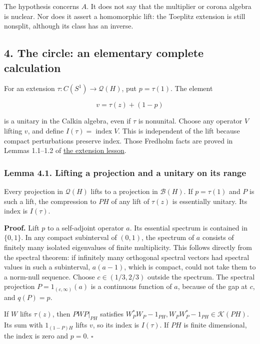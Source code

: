 \documentclass[
  11pt,
]{article}
\begin{document}
The hypothesis concerns \(A\). It does not say that the multiplier or
corona algebra is nuclear. Nor does it assert a homomorphic lift: the
Toeplitz extension is still nonsplit, although its class has an inverse.

\subsection{4. The circle: an elementary complete
calculation}\label{the-circle-an-elementary-complete-calculation}

For an extension \(\tau:C(S^1)\to\mathcal Q(H)\), put \(p=\tau(1)\). The
element

\[
v=\tau(z)+(1-p)
\]

is a unitary in the Calkin algebra, even if \(\tau\) is nonunital.
Choose any operator \(V\) lifting \(v\), and define
\(I(\tau)=\operatorname{index}V\). This is independent of the lift
because compact perturbations preserve index. Those Fredholm facts are
proved in Lemmas 1.1--1.2 of
\href{KT-KK-01.html\#lemma-1-1-the-fredholm-obstruction-survives-compact-errors}{the
extension lesson}.

\subsubsection{Lemma 4.1. Lifting a projection and a unitary on its
range}\label{lemma-4.1.-lifting-a-projection-and-a-unitary-on-its-range}

Every projection in \(\mathcal Q(H)\) lifts to a projection in
\(\mathcal B(H)\). If \(p=\tau(1)\) and \(P\) is such a lift, the
compression to \(PH\) of any lift of \(\tau(z)\) is essentially unitary.
Its index is \(I(\tau)\).

\textbf{Proof.} Lift \(p\) to a self-adjoint operator \(a\). Its
essential spectrum is contained in \(\{0,1\}\). In any compact
subinterval of \((0,1)\), the spectrum of \(a\) consists of finitely
many isolated eigenvalues of finite multiplicity. This follows directly
from the spectral theorem: if infinitely many orthogonal spectral
vectors had spectral values in such a subinterval, \(a(a-1)\), which is
compact, could not take them to a norm-null sequence. Choose
\(c\in(1/3,2/3)\) outside the spectrum. The spectral projection
\(P=1_{(c,\infty)}(a)\) is a continuous function of \(a\), because of
the gap at \(c\), and \(q(P)=p\).

If \(W\) lifts \(\tau(z)\), then \(PWP|_{PH}\) satisfies
\(W_P^*W_P-1_{PH},W_PW_P^*-1_{PH}\in\mathcal K(PH)\). Its sum with
\(1_{(1-P)H}\) lifts \(v\), so its index is \(I(\tau)\). If \(PH\) is
finite dimensional, the index is zero and \(p=0\). \(\square\)
\end{document}

